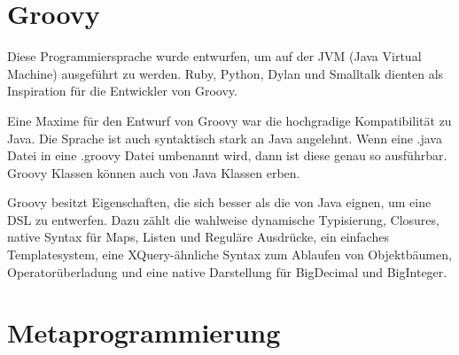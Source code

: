 \documentclass[11pt,english,ngerman, headsepline]{scrreprt}
\begin{document}
\section{Groovy}

Diese Programmiersprache wurde entwurfen, um auf der JVM (Java Virtual Machine)
ausgeführt zu werden. Ruby, Python, Dylan und Smalltalk dienten als Inspiration
für die Entwickler von Groovy.

Eine Maxime für den Entwurf von Groovy war die hochgradige Kompatibilität zu
Java. Die Sprache ist auch syntaktisch stark an Java angelehnt. Wenn eine .java
Datei in eine .groovy Datei umbenannt wird, dann ist diese genau so ausführbar.
Groovy Klassen können auch von Java Klassen erben.

Groovy besitzt Eigenschaften, die sich besser als die von Java eignen, um eine
DSL zu entwerfen. Dazu zählt die wahlweise dynamische Typisierung, Closures,
native Syntax für Maps, Listen und Reguläre Ausdrücke, ein einfaches
Templatesystem, eine
XQuery-ähnliche Syntax zum Ablaufen von Objektbäumen, Operatorüberladung und
eine native Darstellung für BigDecimal und BigInteger.  


\section{Metaprogrammierung}\label{metaprogrammingLabel}

 

\end{document}
